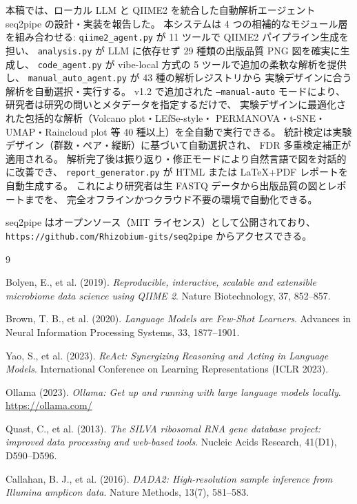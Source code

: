 \documentclass[12pt, a4paper]{article}
\begin{document}
本稿では、ローカル LLM と QIIME2 を統合した自動解析エージェント
seq2pipe の設計・実装を報告した。
本システムは 4 つの相補的なモジュール層を組み合わせる:
\texttt{qiime2\_agent.py} が 11 ツールで QIIME2 パイプライン生成を担い、
\texttt{analysis.py} が LLM に依存せず 29 種類の出版品質 PNG 図を確実に生成し、
\texttt{code\_agent.py} が vibe-local 方式の 5 ツールで追加の柔軟な解析を提供し、
\texttt{manual\_auto\_agent.py} が 43 種の解析レジストリから
実験デザインに合う解析を自動選択・実行する。
v1.2 で追加された \texttt{--manual-auto} モードにより、
研究者は研究の問いとメタデータを指定するだけで、
実験デザインに最適化された包括的な解析（Volcano plot・LEfSe-style・
PERMANOVA・t-SNE・UMAP・Raincloud plot 等 40 種以上）を全自動で実行できる。
統計検定は実験デザイン（群数・ペア・縦断）に基づいて自動選択され、
FDR 多重検定補正が適用される。
解析完了後は振り返り・修正モードにより自然言語で図を対話的に改善でき、
\texttt{report\_generator.py} が HTML または LaTeX+PDF レポートを自動生成する。
これにより研究者は生 FASTQ データから出版品質の図とレポートまでを、
完全オフラインかつクラウド不要の環境で自動化できる。

seq2pipe はオープンソース（MIT ライセンス）として公開されており、
\texttt{https://github.com/Rhizobium-gits/seq2pipe} からアクセスできる。

\begin{thebibliography}{9}

  Bolyen, E., et al. (2019).
  \textit{Reproducible, interactive, scalable and extensible microbiome data science using QIIME 2}.
  Nature Biotechnology, 37, 852--857.

  Brown, T. B., et al. (2020).
  \textit{Language Models are Few-Shot Learners}.
  Advances in Neural Information Processing Systems, 33, 1877--1901.

  Yao, S., et al. (2023).
  \textit{ReAct: Synergizing Reasoning and Acting in Language Models}.
  International Conference on Learning Representations (ICLR 2023).

  Ollama (2023).
  \textit{Ollama: Get up and running with large language models locally}.
  \url{https://ollama.com/}

  Quast, C., et al. (2013).
  \textit{The SILVA ribosomal RNA gene database project: improved data processing and web-based tools}.
  Nucleic Acids Research, 41(D1), D590--D596.

  Callahan, B. J., et al. (2016).
  \textit{DADA2: High-resolution sample inference from Illumina amplicon data}.
  Nature Methods, 13(7), 581--583.

\end{thebibliography}
\end{document}
